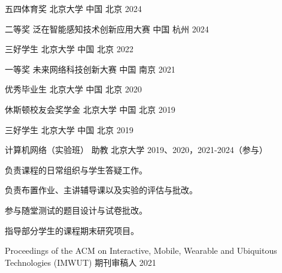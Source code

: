 \documentclass[11pt, a4paper]{awesome-cv-cn}
\begin{document}

\begin{cvhonors}
	
	\cvhonor
	{五四体育奖} %
	{北京大学} %
	{中国 北京} %
	{2024} %
	
	\cvhonor
	{二等奖} %
	{泛在智能感知技术创新应用大赛} %
	{中国 杭州} %
	{2024} %
	
	\cvhonor
	{三好学生} %
	{北京大学} %
	{中国 北京} %
	{2022} %
	
	\cvhonor
	{一等奖} %
	{未来网络科技创新大赛} %
	{中国 南京} %
	{2021} %
	
	\cvhonor
	{优秀毕业生} %
	{北京大学} %
	{中国 北京} %
	{2020} %
	
	\cvhonor
	{休斯顿校友会奖学金} %
	{北京大学} %
	{中国 北京} %
	{2019} %
	
	\cvhonor
	{三好学生} %
	{北京大学} %
	{中国 北京} %
	{2019} %
	
\end{cvhonors}

\begin{cventries}
	
	\cventry
	{计算机网络（实验班）} %
	{助教} %
	{北京大学} %
	{2019、2020，2021-2024（参与）} %
	{
		\begin{cvitems} %
			\item {负责课程的日常组织与学生答疑工作。}
			\item {负责布置作业、主讲辅导课以及实验的评估与批改。}
			\item {参与随堂测试的题目设计与试卷批改。}
			\item {指导部分学生的课程期末研究项目。}
		\end{cvitems}
	}
	
	\cventry
	{Proceedings of the ACM on Interactive, Mobile, Wearable and Ubiquitous Technologies (IMWUT)} %
	{期刊审稿人} %
	{} %
	{2021} %
	{}	
	
\end{cventries}

%
%
%
%
%
%
%
%


\end{document}
